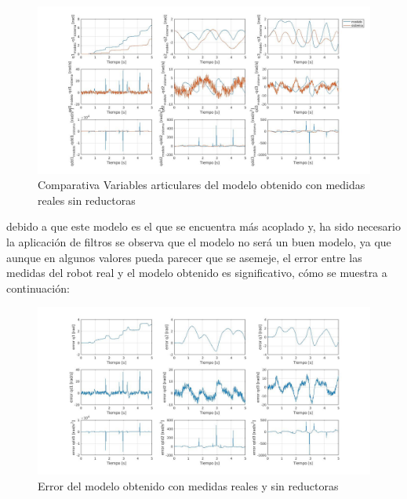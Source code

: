 \begin{figure}[h!]

	\centering

	\includegraphics[width=1\textwidth]{EstimacParam_SisMod_In1_RealSR}

	\caption{Comparativa Variables articulares del modelo obtenido con medidas reales sin reductoras}

\end{figure}



\newpage

debido a que este modelo es el que se encuentra más acoplado y, ha sido necesario la aplicación de filtros se observa que el modelo no será un buen modelo, ya que aunque en algunos valores pueda parecer que se asemeje, el error entre las medidas del robot real y el modelo obtenido es significativo, cómo se muestra a continuación:



\begin{figure}[h!]

	\centering

	\includegraphics[width=1\textwidth]{EstimacParam_SisModError_In1_RealSR}

	\caption{Error del modelo obtenido con medidas reales y sin reductoras}

\end{figure}



